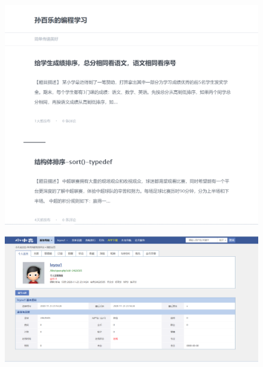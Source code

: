 \documentclass{article}
\begin{document}
\begin{figure}[H]
	\centering
	\includegraphics[width=0.7\linewidth]{个人博客}
	\caption{}
	\label{fig:}
\end{figure}
\begin{figure}[H]
	\centering
	\includegraphics[width=0.7\linewidth]{小木虫}
	\caption{}
	\label{fig:}
\end{figure}
\end{document}
